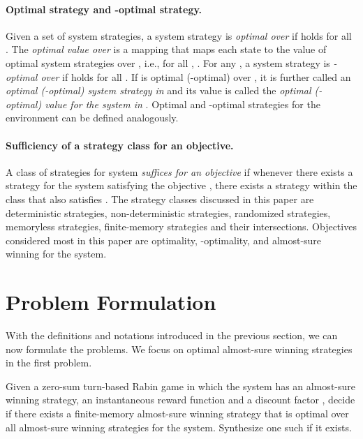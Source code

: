 \documentclass[runningheads,a4paper]{llncs}
\begin{document}
\paragraph{Optimal strategy and -optimal strategy.} Given a set  of system strategies, a system strategy  is \emph{optimal over } if  holds for all . The \emph{optimal value over } is a mapping  that maps each state  to the value of optimal system strategies over , i.e., for all , . For any , a system strategy  is \emph{-optimal over } if  holds for all . If  is optimal (-optimal) over , it is further called an \emph{optimal (-optimal) system strategy in } and its value is called the \emph{optimal (-optimal) value for the system in }. 
Optimal and -optimal strategies for the environment can be defined analogously. 



\paragraph{Sufficiency of a strategy class for an objective.} 
A class  of strategies for system \emph{suffices for an objective } if whenever there exists a strategy for the system satisfying the objective , there exists a strategy within the class  that also satisfies . The strategy classes discussed in this paper are deterministic strategies, non-deterministic strategies, randomized strategies, memoryless strategies, finite-memory strategies and their intersections. Objectives considered most in this paper are optimality, -optimality, and almost-sure winning for the system. 







\section{Problem Formulation}
\label{section:problemFormulation}
With the definitions and notations introduced in the previous section, we can now formulate the problems. We focus on optimal almost-sure winning strategies in the first problem. 
 


\begin{problem}
Given a zero-sum turn-based Rabin game  in which the system has an almost-sure winning strategy, an instantaneous reward function  and a discount factor , decide if there exists a finite-memory almost-sure winning strategy  that is optimal over all almost-sure winning strategies for the system. Synthesize one such  if it exists. 
\label{problem:existence}
\end{problem}
\end{document}
